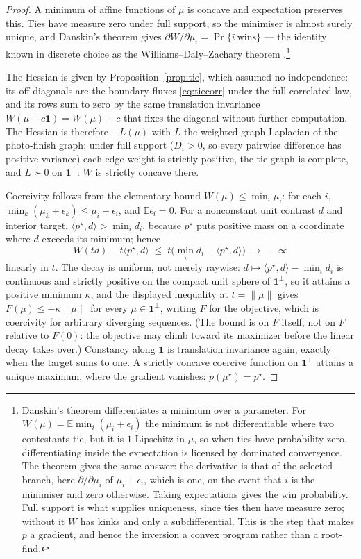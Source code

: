 \documentclass[11pt]{article}
\newcommand{\E}{\mathbb{E}}
\begin{document}
\begin{proof}
A minimum of affine functions of $\mu$ is concave and expectation
preserves this. Ties have measure zero under full support, so the
minimiser is almost surely unique, and Danskin's theorem
\citep{danskin1966} gives
$\partial W/\partial\mu_i=\Pr\{i\ \text{wins}\}$ --- the identity known
in discrete choice as the Williams--Daly--Zachary theorem
\citep{mcfadden1981}.\footnote{Danskin's
theorem differentiates a minimum over a parameter. For
$W(\mu)=\E\min_i(\mu_i+\epsilon_i)$ the minimum is not
differentiable where two contestants tie, but it is $1$-Lipschitz in
$\mu$, so when ties have probability zero, differentiating inside the
expectation is licensed by dominated convergence. The theorem gives the
same answer: the derivative is that of the selected branch, here $\partial/\partial\mu_i$ of
$\mu_i+\epsilon_i$, which is one, on the event that $i$ is the
minimiser and zero otherwise. Taking expectations gives the win
probability. Full support is what supplies uniqueness, since ties then
have measure zero; without it $W$ has kinks and only a subdifferential.
This is the step that makes $p$ a gradient, and hence the inversion a
convex program rather than a root-find.}

The Hessian is given by Proposition~\ref{prop:tie}, which assumed no
independence: its off-diagonals are the boundary fluxes
\eqref{eq:tiecorr} under the full correlated law, and its rows sum to
zero by the same translation invariance $W(\mu+c\mathbf{1})=W(\mu)+c$
that fixes the diagonal without further computation. The Hessian is
therefore $-L(\mu)$ with $L$ the weighted graph Laplacian of the
photo-finish graph; under full support ($D_i>0$, so every pairwise difference has
positive variance) each edge weight is strictly positive, the tie graph
is complete, and $L\succ0$ on $\mathbf{1}^{\perp}$: $W$ is strictly
concave there.

Coercivity follows from the elementary bound
$W(\mu)\le\min_i\mu_i$: for each $i$,
$\min_k(\mu_k+\epsilon_k)\le\mu_i+\epsilon_i$, and $\E\epsilon_i=0$.
For a nonconstant unit contrast $d$ and interior target,
$\langle p^{\star},d\rangle>\min_i d_i$, because $p^{\star}$ puts
positive mass on a coordinate where $d$ exceeds its minimum; hence
\[
W(td)-t\langle p^{\star},d\rangle
 \;\le\; t\bigl(\min_i d_i-\langle p^{\star},d\rangle\bigr)
 \;\longrightarrow\;-\infty
\]
linearly in $t$. The decay is uniform, not merely raywise:
$d\mapsto\langle p^{\star},d\rangle-\min_i d_i$ is continuous and
strictly positive on the compact unit sphere of $\mathbf{1}^{\perp}$,
so it attains a positive minimum $\kappa$, and the displayed inequality
at $t=\lVert\mu\rVert$ gives $F(\mu)\le-\kappa\lVert\mu\rVert$ for every
$\mu\in\mathbf{1}^{\perp}$, writing $F$ for the objective, which is
coercivity for arbitrary diverging sequences. (The bound is on $F$
itself, not on $F$ relative to $F(0)$: the objective may climb toward
its maximizer before the linear decay takes over.) Constancy along
$\mathbf{1}$ is translation invariance
again, exactly when the target sums to one. A strictly concave coercive
function on $\mathbf{1}^{\perp}$ attains a unique maximum, where the
gradient vanishes: $p(\mu^{\star})=p^{\star}$.


\end{proof}
\end{document}
